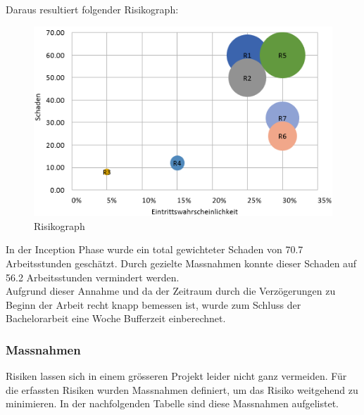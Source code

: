 \medskip \noindent
Daraus resultiert folgender Risikograph: 
\begin{figure}[H]
	\includegraphics[width=\textwidth,height=\textheight,keepaspectratio]{images/risikoanalyse.png}
	\caption{Risikograph}
\end{figure}

\noindent In der Inception Phase wurde ein total gewichteter Schaden von 70.7 Arbeitsstunden geschätzt. Durch gezielte Massnahmen konnte dieser Schaden auf 56.2 Arbeitsstunden vermindert werden. \\
Aufgrund dieser Annahme und da der Zeitraum durch die Verzögerungen zu Beginn der Arbeit recht knapp bemessen ist, wurde zum Schluss der Bachelorarbeit eine Woche Bufferzeit einberechnet. 

\subsubsection*{Massnahmen}
Risiken lassen sich in einem grösseren Projekt leider nicht ganz vermeiden. Für die erfassten Risiken wurden Massnahmen definiert, um das Risiko weitgehend zu minimieren. In der nachfolgenden Tabelle sind diese Massnahmen aufgelistet.

